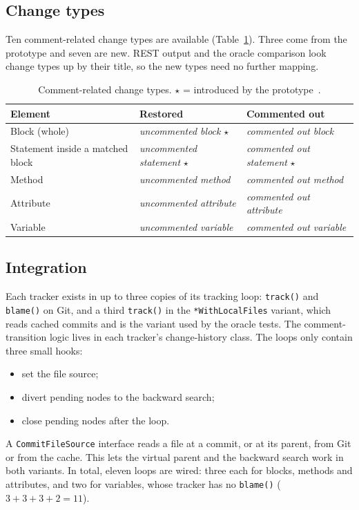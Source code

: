 \documentclass[11pt,a4paper]{article}
\newcommand{\code}[1]{\texttt{#1}}
\newcommand{\change}[1]{\textit{#1}}
\begin{document}
\subsection{Change types}
Ten comment-related change types are available (Table~\ref{tab:types}). Three come from the prototype and seven are new. REST output and the oracle comparison look change types up by their title, so the new types need no further mapping.

\begin{table}[t]
\centering\small
\caption{Comment-related change types. $\star$ = introduced by the prototype~\cite{report2}.}
\label{tab:types}
\begin{tabular}{@{}lll@{}}
\toprule
Element & Restored & Commented out \\
\midrule
Block (whole) & \change{uncommented block} $\star$ & \change{commented out block} \\
Statement inside a matched block & \change{uncommented statement} $\star$ & \change{commented out statement} $\star$ \\
Method & \change{uncommented method} & \change{commented out method} \\
Attribute & \change{uncommented attribute} & \change{commented out attribute} \\
Variable & \change{uncommented variable} & \change{commented out variable} \\
\bottomrule
\end{tabular}
\end{table}

\subsection{Integration}
Each tracker exists in up to three copies of its tracking loop: \code{track()} and \code{blame()} on Git, and a third \code{track()} in the \code{*WithLocalFiles} variant, which reads cached commits and is the variant used by the oracle tests. The comment-transition logic lives in each tracker's change-history class. The loops only contain three small hooks:
\begin{itemize}
  \item set the file source;
  \item divert pending nodes to the backward search;
  \item close pending nodes after the loop.
\end{itemize}
A \code{CommitFileSource} interface reads a file at a commit, or at its parent, from Git or from the cache. This lets the virtual parent and the backward search work in both variants. In total, eleven loops are wired: three each for blocks, methods and attributes, and two for variables, whose tracker has no \code{blame()} ($3+3+3+2=11$).
\end{document}
